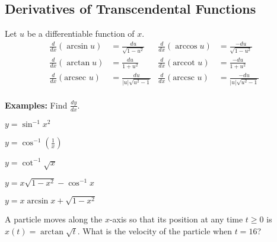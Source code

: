 \subsection*{Derivatives of Transcendental Functions}
\begin{tcolorbox}[title= DERIVATIVES OF INVERSE TRIGONOMETRIC FUNCTIONS,colframe=black,sharp corners, colback=white, colbacktitle=white, coltitle=black, boxrule=1pt]
    
    Let $u$ be a differentiable function of $x$.
    \begin{align*}
        \frac{d}{dx}(\arcsin u) &= \frac{du}{\sqrt{1-u^2}} & \frac{d}{dx}(\arccos u) &= \frac{-du}{\sqrt{1-u^2}}\\
        \frac{d}{dx}(\arctan u) &= \frac{du}{1+u^2} & \frac{d}{dx}(\text{arccot } u) &= \frac{-du}{1+u^2}\\
        \frac{d}{dx}(\text{arcsec } u) &= \frac{du}{|u|\sqrt{u^2-1}} & \frac{d}{dx}(\text{arccsc } u) &= \frac{-du}{|u|\sqrt{u^2-1}}\\
    \end{align*}
\end{tcolorbox}
\vspace{.15cm}
\noindent\textbf{Examples:} Find $\displaystyle\frac{dy}{dx}$.
\begin{questions}
    \question $\displaystyle y=\sin^{-1}x^2$
    
    \question $\displaystyle y=\cos^{-1}\left(\frac{1}{x}\right)$
    
    \question $\displaystyle y=\cot^{-1}\sqrt{x}$
    
    \question $\displaystyle y=x\sqrt{1-x^2}-\cos^{-1}x$
    
    \newpage
    
    \question $\displaystyle y=x\arcsin x+\sqrt{1-x^2}$
    
    \question A particle moves along the $x$-axis so that its position at any time $t\ge0$ is $x(t)=\arctan\sqrt{t}$. What is the velocity of the particle when $t=16$?
\end{questions}


